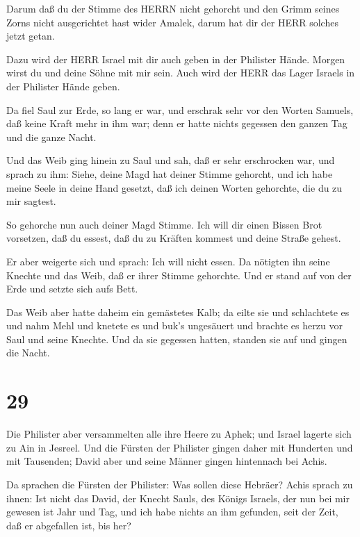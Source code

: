  Darum daß du der Stimme des HERRN nicht gehorcht und den
Grimm seines Zorns nicht ausgerichtet hast wider Amalek, darum hat dir
der HERR solches jetzt getan.

 Dazu wird der HERR Israel mit dir auch geben in der
Philister Hände. Morgen wirst du und deine Söhne mit mir sein. Auch wird
der HERR das Lager Israels in der Philister Hände geben.

 Da fiel Saul zur Erde, so lang er war, und erschrak sehr
vor den Worten Samuels, daß keine Kraft mehr in ihm war; denn er hatte
nichts gegessen den ganzen Tag und die ganze Nacht.

 Und das Weib ging hinein zu Saul und sah, daß er sehr
erschrocken war, und sprach zu ihm: Siehe, deine Magd hat deiner Stimme
gehorcht, und ich habe meine Seele in deine Hand gesetzt, daß ich deinen
Worten gehorchte, die du zu mir sagtest.

 So gehorche nun auch deiner Magd Stimme. Ich will dir
einen Bissen Brot vorsetzen, daß du essest, daß du zu Kräften kommest
und deine Straße gehest.

 Er aber weigerte sich und sprach: Ich will nicht essen. Da
nötigten ihn seine Knechte und das Weib, daß er ihrer Stimme gehorchte.
Und er stand auf von der Erde und setzte sich aufs Bett.

 Das Weib aber hatte daheim ein gemästetes Kalb; da eilte
sie und schlachtete es und nahm Mehl und knetete es und buk's ungesäuert
 und brachte es herzu vor Saul und seine Knechte. Und da
sie gegessen hatten, standen sie auf und gingen die Nacht.

\hypertarget{section-28}{%
\section{29}\label{section-28}}

 Die Philister aber versammelten alle ihre Heere zu Aphek;
und Israel lagerte sich zu Ain in Jesreel.  Und die Fürsten
der Philister gingen daher mit Hunderten und mit Tausenden; David aber
und seine Männer gingen hintennach bei Achis.

 Da sprachen die Fürsten der Philister: Was sollen diese
Hebräer? Achis sprach zu ihnen: Ist nicht das David, der Knecht Sauls,
des Königs Israels, der nun bei mir gewesen ist Jahr und Tag, und ich
habe nichts an ihm gefunden, seit der Zeit, daß er abgefallen ist, bis
her?

